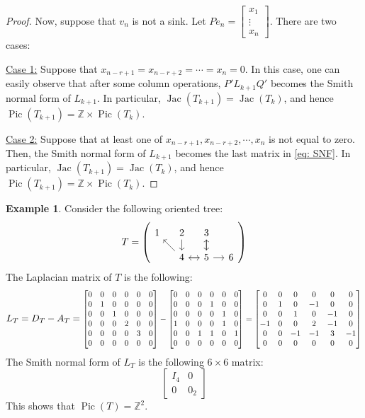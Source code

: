 \documentclass[11pt,reqno]{amsart}
\DeclareMathOperator{\Pic}{Pic}
\DeclareMathOperator{\Jac}{Jac}
\newcommand\scalemath[2]{\scalebox{#1}{\mbox{\ensuremath{\displaystyle #2}}}}
\theoremstyle{definition}
\newtheorem{myeg}[mydef]{Example}
\theoremstyle{plain}
\begin{document}
\begin{proof}
Now, suppose that $v_n$ is not a sink. Let $Pe_n=\begin{bmatrix}
x_1\\
\vdots \\
x_{n}
\end{bmatrix}$. There are two cases:

\noindent \underline{Case 1:} Suppose that $x_{n-r+1}=x_{n-r+2}=\cdots=x_n=0$. In this case, one can easily observe that after some column operations, $P'L_{k+1}Q'$ becomes the Smith normal form of $L_{k+1}$. In particular, $\Jac(T_{k+1})=\Jac(T_k)$, and hence $\Pic(T_{k+1})=\mathbb{Z}\times \Pic(T_k)$. 

\noindent \underline{Case 2:} Suppose that at least one of $x_{n-r+1}, x_{n-r+2},\cdots, x_n$ is not equal to zero. Then, the Smith normal form of $L_{k+1}$ becomes the last matrix in \eqref{eq: SNF}. In particular, $\Jac(T_{k+1})=\Jac(T_k)$, and hence $\Pic(T_{k+1})=\mathbb{Z}\times \Pic(T_k)$. 
\end{proof}

\begin{myeg}\label{example: oriented tree}
Consider the following oriented tree:
\[
T=\left(\begin{tikzcd}[row sep=0.4cm, column sep=0.4cm]
1
& 2 \arrow[d,swap] &  3 \arrow[d] & \\
& 4\arrow[r,swap] \arrow[ul] & 5 \arrow[l] \arrow[u]\arrow[r,swap] & 6
\end{tikzcd}\right)
\]
The Laplacian matrix of $T$ is the following:
\[
L_T = D_T - A_T = \scalemath{0.85}{\begin{bmatrix}
0& 0& 0& 0& 0&0 \\
0& 1&0 & 0& 0&0 \\
0& 0& 1& 0& 0&0 \\
0&0 &0 &2 &0 & 0\\
0&0 &0 &0 &3 &0 \\
0& 0& 0& 0& 0&0
\end{bmatrix} - \begin{bmatrix}
0 & 0& 0& 0& 0& 0\\
0& 0& 0&1 &0 & 0\\
0&0 &0 &0 &1 &0 \\
1& 0& 0& 0&1 &0 \\
0& 0& 1&1 &0 &1 \\
0& 0& 0& 0& 0& 0
\end{bmatrix} = \begin{bmatrix}
0&0 &0 &0 &0 &0 \\
0&1 &0 &-1 &0 &0 \\
0& 0& 1&0 &-1 &0 \\
-1& 0& 0& 2&-1 &0 \\
0&0 &-1 &-1 &3 &-1 \\
0& 0&0 &0 &0 &0
\end{bmatrix}}
\]
The Smith normal form of $L_T$ is the following $6\times 6$ matrix:
\[
\left[\begin{array}{c|c}
I_4 & 0 \\ \hline
0 & 0_2
\end{array}\right]
\]
This shows that $\Pic(T)=\mathbb{Z}^2$.
\end{myeg}
\end{document}
